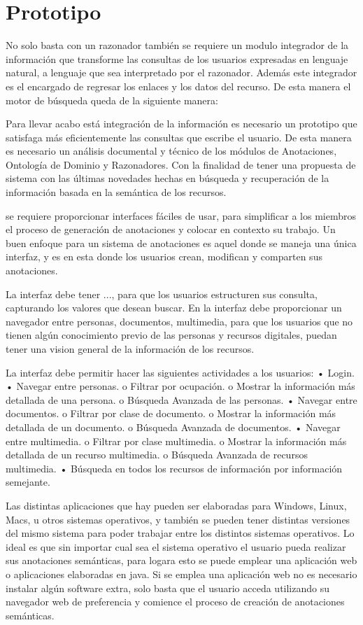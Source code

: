 \chapter{Prototipo}
\label{cap:piu}
No solo basta con un razonador también se requiere un modulo integrador de la información que transforme las consultas de los usuarios expresadas en lenguaje natural, a lenguaje que sea interpretado por el razonador. Además este integrador es el encargado de regresar los enlaces y los datos del recurso. De esta manera el motor de búsqueda queda de la siguiente manera:

Para llevar acabo está integración de la información es necesario un prototipo que satisfaga más eficientemente las consultas que escribe el usuario. De esta manera es necesario un análisis documental y técnico de los módulos de Anotaciones, Ontología de Dominio y Razonadores. Con la finalidad de tener una propuesta de sistema con las últimas novedades hechas en búsqueda y recuperación de la información basada en la semántica de los recursos.

se requiere proporcionar interfaces fáciles de usar, para simplificar a los miembros el proceso de generación de anotaciones y colocar en contexto su trabajo.  Un buen enfoque para un sistema de anotaciones es aquel donde se maneja una única interfaz, y es en esta donde los usuarios crean, modifican y comparten sus anotaciones.

La interfaz debe tener ..., para que los usuarios estructuren sus consulta, capturando los valores que desean buscar. En la interfaz debe proporcionar un navegador entre personas, documentos, multimedia, para que los usuarios que no tienen algún conocimiento previo de las personas y recursos digitales, puedan tener una vision general de la información de los recursos.

La interfaz debe permitir hacer las siguientes actividades a los usuarios:
•	Login.
•	Navegar entre personas.
o	Filtrar por ocupación.
o	Mostrar la información más detallada de una persona.
o	Búsqueda Avanzada de las personas.
•	Navegar entre documentos.
o	Filtrar por clase de documento.
o	Mostrar la información más detallada de un documento.
o	Búsqueda Avanzada de documentos.
•	Navegar entre multimedia.
o	Filtrar por clase multimedia.
o	Mostrar la información más detallada de un recurso multimedia.
o	Búsqueda Avanzada de recursos multimedia.
•	Búsqueda en todos los recursos de información por información semejante.

Las distintas aplicaciones que hay pueden ser elaboradas para Windows, Linux, Macs, u otros sistemas operativos, y también se pueden tener distintas versiones del mismo sistema para poder trabajar entre los distintos sistemas operativos. Lo ideal es que sin importar cual sea el sistema operativo el usuario pueda realizar sus anotaciones semánticas, para logara esto se puede emplear una aplicación web o aplicaciones elaboradas en java.
Si se emplea una aplicación web no es necesario instalar algún software extra, solo basta que el usuario acceda utilizando su navegador web de preferencia y comience el proceso de creación de anotaciones semánticas.

